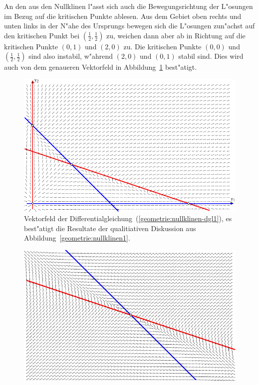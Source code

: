 \begin{beispiel}
An den aus den Nullklinen l"asst sich auch die Bewegungsrichtung der
L"osungen im Bezug auf die kritischen Punkte ablesen.
\label{geometrie:nullklinen-stabilitaet}
Aus dem Gebiet oben rechts und unten links in der N"ahe des Ursprungs
bewegen sich die L"osungen zun"achst auf den kritischen Punkt
bei $(\frac12,\frac12)$ zu, weichen dann aber ab in Richtung auf die
kritischen Punkte $(0,1)$ und $(2,0)$ zu.
Die kritischen Punkte $(0,0)$ und $(\frac12,\frac12)$ sind also
instabil, w"ahrend $(2,0)$ und $(0,1)$ stabil sind.
Dies wird auch von dem genaueren Vektorfeld in
Abbildung~\ref{geometrie:nullklinen-fluss} best"atigt.
\begin{figure}
\centering
\includegraphics{chapters/images/nullklinen-2.pdf}
\caption{Vektorfeld der Differentialgleichung~(\ref{geometrie:nullklinen-dgl1}),
es best"atigt die Resultate der qualitiativen Diskussion aus
Abbildung~\ref{geometrie:nullklinen1}.
\label{geometrie:nullklinen-fluss}}
\end{figure}
\begin{figure}
\centering
\includegraphics{chapters/images/nullklinen-3.pdf}

\end{figure}
\end{beispiel}
